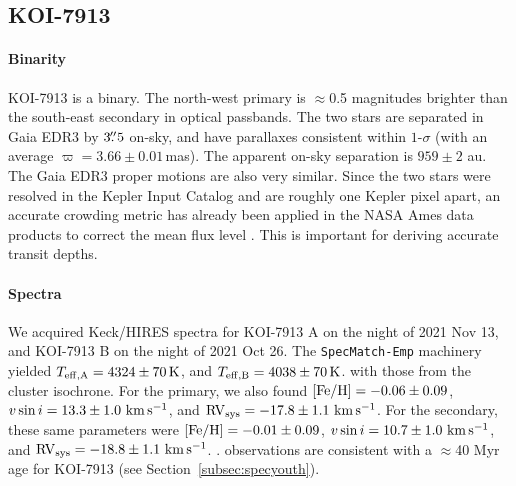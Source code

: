 \documentclass[12pt,twocolumn,tighten,linenumbers]{aastex63}
\newcommand{\mkms}{{\rm \,km\,s^{-1}}}  %
\begin{document}
\subsection{KOI-7913}
\label{subsec:koi7913}

\paragraph{Binarity}
KOI-7913 is a binary.  The north-west primary is
$\approx$0.5 magnitudes brighter than the south-east secondary in
optical passbands.  The two stars are separated in Gaia EDR3 by
$3\mbox{$.\!\!^{\prime\prime}$}5$ on-sky, and have parallaxes consistent within $1$-$\sigma$
(with an average $\varpi=3.66 \pm 0.01$\,mas).  The apparent on-sky
separation is $959 \pm 2$ au.  The Gaia EDR3 proper motions are also
very similar.  Since the two stars were resolved in the Kepler Input
Catalog and are roughly one Kepler pixel apart, an accurate crowding
metric has already been applied in the NASA Ames data products to
correct the mean flux level \citep{2017ksci.rept....6M}.  This is
important for deriving accurate transit depths.

\paragraph{Spectra}
We acquired Keck/HIRES spectra for KOI-7913 A on the night of 2021 Nov
13, and KOI-7913 B on the night of 2021 Oct 26.  The
\texttt{SpecMatch-Emp} machinery yielded $T_{\rm eff,A} = 4324 \pm
70\,{\rm K}$, and $T_{\rm eff,B} = 4038 \pm 70\,{\rm K}$.   with those from the cluster
isochrone.  For the primary, we also found $[{\rm Fe/H}]= -0.06 \pm
0.09$, $v\sin i = 13.3 \pm 1.0\,\mkms$, and ${\rm RV}_{\rm sys} =
-17.8 \pm 1.1\,\mkms$.  For the secondary, these same parameters were
$[{\rm Fe/H}]= -0.01 \pm 0.09$, $v\sin i = 10.7 \pm 1.0\,\mkms$, and
${\rm RV}_{\rm sys} = -18.8 \pm 1.1\,\mkms$.  .   observations
are consistent with a $\approx$40 Myr age for KOI-7913 (see
Section~\ref{subsec:specyouth}).
\end{document}

